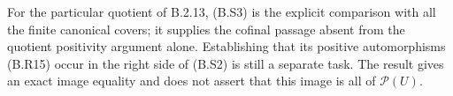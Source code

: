 For the particular quotient of B.2.13, (B.S3) is the
explicit comparison with all the finite canonical covers;
it supplies the cofinal passage absent from the quotient
positivity argument alone.  Establishing that its positive
automorphisms (B.R15) occur in the right side of (B.S2)
is still a separate task.  The result gives an exact image
equality and does not assert that this image is all of
$\mathscr P(U)$.
